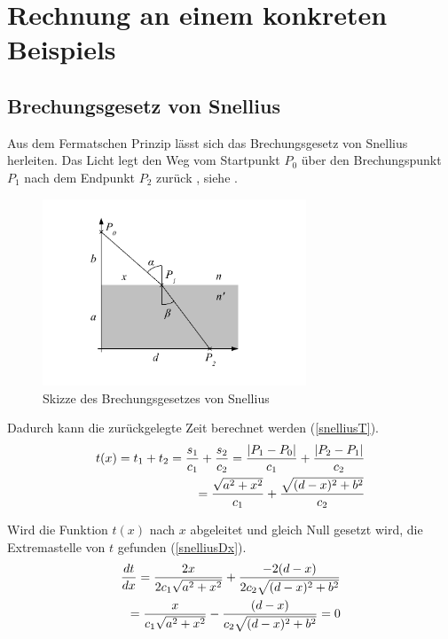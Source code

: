 \section{Rechnung an einem konkreten Beispiels}

\subsection{Brechungsgesetz von Snellius \label{brechungsgesetz}}
Aus dem Fermatschen Prinzip lässt sich das Brechungsgesetz von Snellius herleiten.
Das Licht legt den Weg vom Startpunkt $P_0$ über den Brechungspunkt $P_1$ 
nach dem Endpunkt $P_2$ zurück \cite{Wikipedia}, siehe  .
\begin{figure}[H]
\begin{center}
	\includegraphics[width=0.7\textwidth]{./picture/Brechung.pdf}
	\caption{Skizze des Brechungsgesetzes von Snellius}
	\label{Ab:brechung}
\end{center}
\end{figure}

Dadurch kann die zurückgelegte Zeit berechnet werden (\eqref{snelliusT}).
\begin{align}
t(x) = t_1 + t_2 = \frac{s_1}{c_1} + \frac{s_2}{c_2} = \frac{|P_1 - P_0|}{c_1} + \frac{|P_2 - P_1|}{c_2} \notag \\
= \frac{\sqrt{a^2 + x^2}}{c_1} + \frac{\sqrt{(d-x)^2 + b^2}}{c_2} \label{snelliusT}
\end{align}

Wird die Funktion $t(x)$ nach $x$ abgeleitet und gleich Null gesetzt wird, die Extremastelle von $t$ gefunden (\eqref{snelliusDx}).
\begin{align}
	\frac{dt}{dx} = \frac{2 x}{2  c_1  \sqrt{a^2 + x^2}} + \frac{-2  (d-x)}{2  c_2  \sqrt{(d-x)^2 + b^2}} \notag \\
	= \frac{x}{c_1 \sqrt{a^2 + x^2}} - \frac{(d-x)}{c_2  \sqrt{(d-x)^2 + b^2}} = 0 
	\label{snelliusDx}
\end{align}

